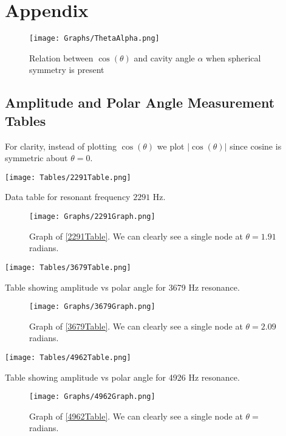 

\section{Appendix}
\label{AppendixA}

\begin{figure}[H]
	\captionsetup{justification = raggedright}
	\texttt{[image: Graphs/ThetaAlpha.png]}
	\caption{Relation between $\cos(\theta)$ and cavity angle $\alpha$ when spherical symmetry is present}
	\label{ThetaAlpha}
\end{figure}



\subsection{Amplitude and Polar Angle Measurement Tables}
For clarity, instead of plotting $\cos(\theta)$ we plot $|\cos(\theta)|$ since cosine is symmetric about $\theta = 0$.

\begin{multicols}{2}
	\begin{table}[H]
		\texttt{[image: Tables/2291Table.png]}
		\caption{Data table for resonant frequency $2291$ Hz.}
		\label{2291Table}		
	\end{table} 
	\columnbreak
	\begin{figure}[H]
		\texttt{[image: Graphs/2291Graph.png]}
		\caption{Graph of \cref{2291Table}. We can clearly see a single node at $\theta = 1.91$ radians.}
		\label{2291Graph}
	\end{figure}
\end{multicols}

\begin{multicols}{2}
	\begin{table}[H]
		\texttt{[image: Tables/3679Table.png]}
		\caption{Table showing amplitude vs polar angle for 3679 Hz resonance.}
		\label{3679Table}		
	\end{table} 
	\columnbreak
	\begin{figure}[H]
		\texttt{[image: Graphs/3679Graph.png]}
		\caption{Graph of \cref{3679Table}. We can clearly see a single node at $\theta = 2.09$ radians.}
		\label{3679Graph}
	\end{figure}
\end{multicols}

\begin{multicols}{2}	
	\begin{table}[H]
		\texttt{[image: Tables/4962Table.png]}
		\caption{Table showing amplitude vs polar angle for 4926 Hz resonance.}
		\label{4962Table}		
	\end{table}
	\columnbreak
	\begin{figure}[H]
		\texttt{[image: Graphs/4962Graph.png]}
		\caption{Graph of \cref{4962Table}. We can clearly see a single node at $\theta = $ radians.}
		\label{4962Graph}
	\end{figure}
\end{multicols}


